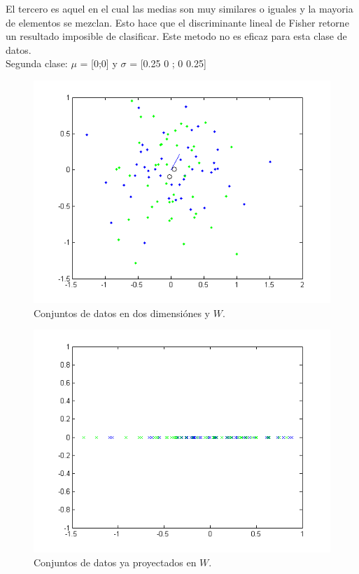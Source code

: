 El tercero es aquel en el cual las medias son muy similares o iguales y la mayoria de elementos se mezclan. Esto hace que el discriminante lineal de Fisher retorne un resultado imposible de clasificar. Este metodo no es eficaz para esta clase de datos.\\
Segunda clase: $\mu$ = [0;0] y $\sigma$ = [0.25 0 ; 0 0.25]

\begin{figure}[ht!]
\centering
\includegraphics[width=120mm]{img/tp4/ej4-5.png}
\caption{Conjuntos de datos en dos dimensiónes y $W$.}
\end{figure}

\begin{figure}[ht!]
\centering
\includegraphics[width=120mm]{img/tp4/ej4-6.png}
\caption{Conjuntos de datos ya proyectados en $W$.}
\end{figure}
